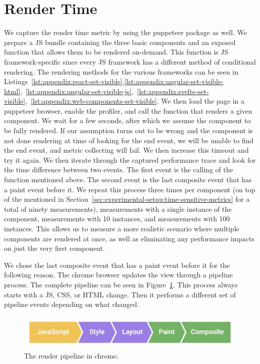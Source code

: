 \section{Render Time}
We capture the render time metric by using the puppeteer package as well. We prepare a JS bundle containing the three basic components and an exposed function that allows them to be rendered on-demand. This function is JS framework-specific since every JS framework has a different method of conditional rendering. The rendering methods for the various frameworks can be seen in Listings~\ref{lst:appendix:react-set-visible},\ref{lst:appendix:angular-set-visible-html},~\ref{lst:appendix:angular-set-visible-js},~\ref{lst:appendix:svelte-set-visible},~\ref{lst:appendix:web-components-set-visible}. We then load the page in a puppeteer browser, enable the profiler, and call the function that renders a given component. We wait for a few seconds, after which we assume the component to be fully rendered. If our assumption turns out to be wrong and the component is not done rendering at time of looking for the end event, we will be unable to find the end event, and metric collecting will fail. We then increase this timeout and try it again. We then iterate through the captured performance trace and look for the time difference between two events. The first event is the calling of the function mentioned above. The second event is the last composite event that has a paint event before it. We repeat this process three times per component (on top of the \numMeasures{} mentioned in Section~\ref{sec:experimental-setup:time-sensitive-metrics} for a total of ninety measurements), \numMeasures{} measurements with a single instance of the component, \numMeasures{} measurements with 10 instances, and \numMeasures{} measurements with 100 instances. This allows us to measure a more realistic scenario where multiple components are rendered at once, as well as eliminating any performance impacts on just the very first component.

We chose the last composite event that has a paint event before it for the following reason. The chrome browser updates the view through a pipeline process. The complete pipeline can be seen in Figure~\ref{fig:experimental-setup:pipeline}. This process always starts with a JS, CSS, or HTML change. Then it performs a different set of pipeline events depending on what changed.

\begin{figure}[h]
  \includegraphics[width=\columnwidth]{figures/experimental-setup/render-pipeline.jpg}
  \caption{The render pipeline in chrome.}
  \label{fig:experimental-setup:pipeline}
  \centering
\end{figure}

